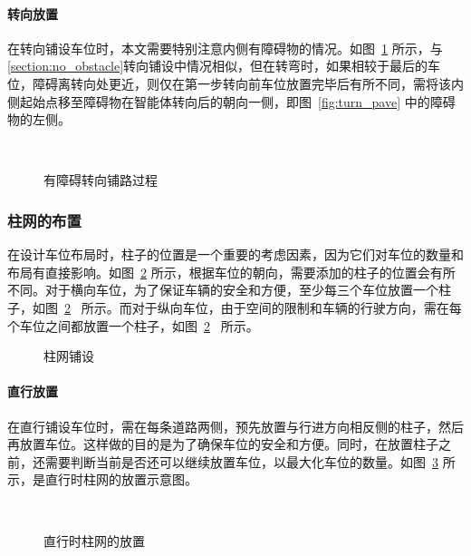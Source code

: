 \paragraph{转向放置}
在转向铺设车位时，本文需要特别注意内侧有障碍物的情况。如图~\ref{fig:turn_obstacle} 所示，与\ref{section:no_obstacle}转向铺设中情况相似，但在转弯时，如果相较于最后的车位，障碍离转向处更近，则仅在第一步转向前车位放置完毕后有所不同，需将该内侧起始点移至障碍物在智能体转向后的朝向一侧，即图~\ref{fig:turn_pave} 中的障碍物的左侧。
\begin{figure}[!htb]
    \centering
	\hspace{1cm}
	\\
    \caption{\label{fig:turn_obstacle}有障碍转向铺路过程}
\end{figure}
\subsubsection{柱网的布置}
在设计车位布局时，柱子的位置是一个重要的考虑因素，因为它们对车位的数量和布局有直接影响。如图~\ref{fig:column_pave} 所示，根据车位的朝向，需要添加的柱子的位置会有所不同。对于横向车位，为了保证车辆的安全和方便，至少每三个车位放置一个柱子，如图~\ref{fig:column_pave}~ 所示。而对于纵向车位，由于空间的限制和车辆的行驶方向，需在每个车位之间都放置一个柱子，如图~\ref{fig:column_pave}~ 所示。
\begin{figure}[!htb]
    \centering
    \caption{\label{fig:column_pave}柱网铺设}
\end{figure}
\paragraph{直行放置}
在直行铺设车位时，需在每条道路两侧，预先放置与行进方向相反侧的柱子，然后再放置车位。这样做的目的是为了确保车位的安全和方便。同时，在放置柱子之前，还需要判断当前是否还可以继续放置车位，以最大化车位的数量。如图~\ref{fig:strai_pillar} 所示，是直行时柱网的放置示意图。
\begin{figure}[!htb]
    \centering
    \\
    \caption{\label{fig:strai_pillar}直行时柱网的放置}
\end{figure}
